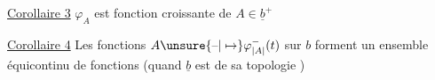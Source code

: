 \uline{Corollaire 3} $\varphi_A$ est fonction croissante de $A\in\underline b^+$

\uline{Corollaire 4} Les fonctions $A\unsure{\text{--}|\mapsto}\varphi^-_{\lvert A\rvert}(t)$ sur $b$ forment un ensemble équicontinu de fonctions (quand $\underline b$ est  de sa topologie )

